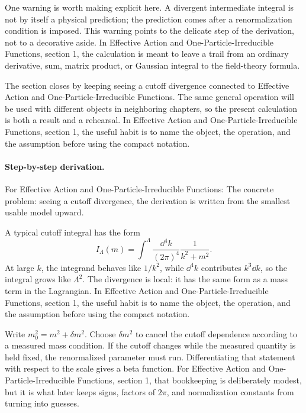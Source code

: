 One warning is worth making explicit here.  A divergent intermediate integral is not by itself a physical prediction; the prediction comes after a renormalization condition is imposed.  This warning points to the delicate step of the derivation, not to a decorative aside.  In Effective Action and One-Particle-Irreducible Functions, section 1, the calculation is meant to leave a trail from an ordinary derivative, sum, matrix product, or Gaussian integral to the field-theory formula.

The section closes by keeping seeing a cutoff divergence connected to Effective Action and One-Particle-Irreducible Functions.  The same general operation will be used with different objects in neighboring chapters, so the present calculation is both a result and a rehearsal.  In Effective Action and One-Particle-Irreducible Functions, section 1, the useful habit is to name the object, the operation, and the assumption before using the compact notation.



\paragraph{Step-by-step derivation.}

For Effective Action and One-Particle-Irreducible Functions: The concrete problem: seeing a cutoff divergence, the derivation is written from the smallest usable model upward.

A typical cutoff integral has the form
\[
  I_\Lambda(m)=\int^{\Lambda}\frac{\dd^4k}{(2\pi)^4}\frac{1}{k^2+m^2}.
\]
At large \(k\), the integrand behaves like \(1/k^2\), while \(\dd^4k\) contributes \(k^3\dd k\), so the integral grows like \(\Lambda^2\).  The divergence is local: it has the same form as a mass term in the Lagrangian.  In Effective Action and One-Particle-Irreducible Functions, section 1, the useful habit is to name the object, the operation, and the assumption before using the compact notation.

Write \(m_0^2=m^2+\delta m^2\).  Choose \(\delta m^2\) to cancel the cutoff dependence according to a measured mass condition.  If the cutoff changes while the measured quantity is held fixed, the renormalized parameter must run.  Differentiating that statement with respect to the scale gives a beta function.  For Effective Action and One-Particle-Irreducible Functions, section 1, that bookkeeping is deliberately modest, but it is what later keeps signs, factors of \(2\pi\), and normalization constants from turning into guesses.

